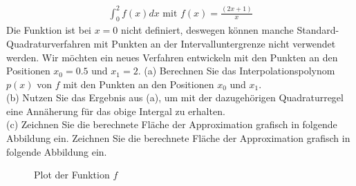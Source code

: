 \documentclass{scrartcl}
\begin{document}
\begin{align*}
\int_{0}^{2} f(x) dx \text{ mit } f(x) = \frac{(2x + 1)}{x}
\end{align*}
Die Funktion ist bei $x=0$ nicht definiert, deswegen können manche Standard-Quadraturverfahren mit Punkten an der Intervalluntergrenze nicht verwendet werden. Wir möchten ein neues Verfahren entwickeln mit den Punkten an den Positionen $x_0 = 0.5$ und $x_1 = 2$.
\n 
(a)
Berechnen Sie das Interpolationspolynom $p(x)$ von $f$ mit den Punkten an den Positionen $x_0$ und $x_1$.
\lbreak
\\
(b)
Nutzen Sie das Ergebnis aus (a), um mit der dazugehörigen Quadraturregel eine Annäherung für das obige Intergal zu erhalten.
\lbreak
\\
(c) 
Zeichnen Sie die berechnete Fläche der Approximation grafisch in folgende Abbildung ein.
\newpage
\noindent Zeichnen Sie die berechnete Fläche der Approximation grafisch in folgende Abbildung ein.
\begin{figure}[ht]
	\centering
	\caption{Plot der Funktion $f$}
\end{figure}
\end{document}
